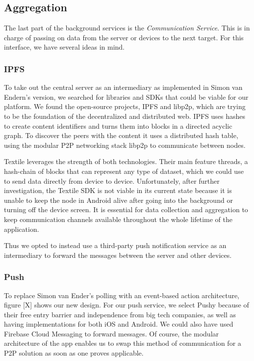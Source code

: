 \subsection{Aggregation}
The last part of the background services is the \textit{Communication Service}. This is in charge of passing on data from the server or devices to the next target. For this interface, we have several ideas in mind.
 
\subsubsection{IPFS}
To take out the central server as an intermediary as implemented in Simon van Endern's version, we searched for libraries and SDKs that could be viable for our platform. We found the open-source projects, IPFS and libp2p, which are trying to be the foundation of the decentralized and distributed web. IPFS uses hashes to create content identifiers and turns them into blocks in a directed acyclic graph. To discover the peers with the content it uses a distributed hash table, using the modular P2P networking stack libp2p to communicate between nodes.

Textile leverages the strength of both technologies. Their main feature threads, a hash-chain of blocks that can represent any type of dataset, which we could use to send data directly from device to device. Unfortunately, after further investigation, the Textile SDK is not viable in its current state because it is unable to keep the node in Android alive after going into the background or turning off the device screen. It is essential for data collection and aggregation to keep communication channels available throughout the whole lifetime of the application.

Thus we opted to instead use a third-party push notification service as an intermediary to forward the messages between the server and other devices.

\subsubsection{Push}
To replace Simon van Ender's polling with an event-based action architecture, figure [X] shows our new design. For our push service, we select Pushy
because of their free entry barrier and independence from big tech companies, as well as having implementations for both iOS and Android. We could also have used Firebase Cloud Messaging to forward messages. Of course, the modular architecture of the app enables us to swap this method of communication for a P2P solution as soon as one proves applicable.

